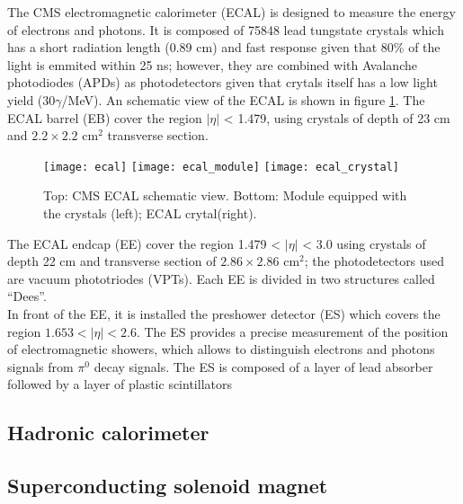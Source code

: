 \noindent The CMS electromagnetic calorimeter (ECAL) is designed to measure the energy of electrons and photons. It is composed of 75848 lead tungstate crystals which has a short radiation length (0.89 cm) and fast response given that 80\% of the light is emmited within 25 ns; however, they are combined with Avalanche photodiodes (APDs) as photodetectors given that crytals itself has a low light yield (30$\gamma$/MeV). An schematic view of the ECAL is shown in figure \ref{fig:ecal}. The ECAL barrel (EB) cover the region $|\eta|$ < 1.479, using crystals of depth of 23 cm and  $2.2\times 2.2$ cm$^2$ transverse section. 
\begin{figure}[h!]
  \centering
  \texttt{[image: ecal]}
  \texttt{[image: ecal\_module]}
  \texttt{[image: ecal\_crystal]} 
  \caption[CMS ECAL schematic view]{Top: CMS ECAL schematic view. Bottom: Module equipped with the crystals (left); ECAL crytal(right).}
  \label{fig:ecal}
\end{figure}

\noindent The ECAL endcap (EE) cover the region 1.479 < $|\eta|$ < 3.0 using crystals of depth 22 cm and transverse section of $2.86\times2.86$ cm$^2$; the photodetectors used are vacuum phototriodes (VPTs). Each EE is divided in two structures called ``Dees''.\\

\noindent In front of the EE, it is installed the preshower detector (ES) which covers the region $1.653 < |\eta| < 2.6$. The ES provides a precise measurement of the position of electromagnetic showers, which allows to distinguish electrons and photons signals from $\pi^0$ decay signals. The ES is composed of a layer of lead absorber followed by a layer of plastic scintillators

\subsection{Hadronic calorimeter}

\subsection{Superconducting solenoid magnet}

